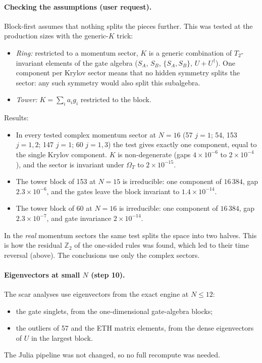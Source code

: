 \paragraph{Checking the assumptions (user request).} Block-first assumes that nothing splits the pieces further. This
was tested at the production sizes with the generic-$K$ trick:
\begin{itemize}
\item \emph{Ring:} restricted to a momentum sector, $K$ is a generic combination of $T_2$-invariant elements of the gate
  algebra ($S_A$, $S_B$, $\{S_A,S_B\}$, $U+U^\dagger$). One component per Krylov sector means that no hidden symmetry
  splits the sector: any such symmetry would also split this subalgebra.
\item \emph{Tower:} $K=\sum_ia_ig_i$ restricted to the block.
\end{itemize}
Results:
\begin{itemize}
\item In every tested complex momentum sector at $N=16$ (57 $j{=}1$; 54, 153 $j{=}1,2$; 147 $j{=}1$; 60 $j{=}1,3$) the
  test gives exactly one component, equal to the single Krylov component. $K$ is non-degenerate (gaps
  $4\times10^{-6}$ to $2\times10^{-4}$), and the sector is invariant under $\Omega_T$ to $2\times10^{-15}$.
\item The tower block of 153 at $N=15$ is irreducible: one component of $16\,384$, gap $2.3\times10^{-6}$, and the gates
  leave the block invariant to $1.4\times10^{-14}$.
\item The tower block of 60 at $N=16$ is irreducible: one component of $16\,384$, gap $2.3\times10^{-7}$, and gate
  invariance $2\times10^{-14}$.
\end{itemize}
In the \emph{real} momentum sectors the same test splits the space into two halves. This is how the residual
$\mathbb Z_2$ of the one-sided rules was found, which led to their time reversal (above). The conclusions use only the
complex sectors.

\paragraph{Eigenvectors at small $N$ (step 10).} The scar analyses use eigenvectors from the exact engine at
$N\le12$:
\begin{itemize}
\item the gate singlets, from the one-dimensional gate-algebra blocks;
\item the outliers of 57 and the ETH matrix elements, from the dense eigenvectors of $U$ in the largest block.
\end{itemize}
The Julia pipeline was not changed, so no full recompute was needed.
